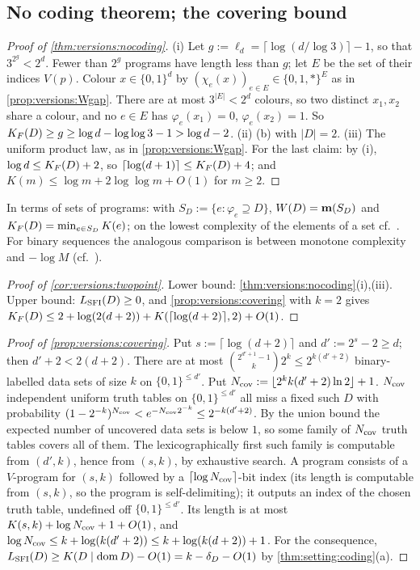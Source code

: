 \subsection{No coding theorem; the covering bound}\label{app:versions:nocoding}

\begin{proof}[Proof of \cref{thm:versions:nocoding}]
(i) Let $g:=\ell_d=\lceil\log(d/\log3)\rceil-1$, so that $3^{2^g}<2^d$. Fewer than $2^g$ programs have length less than $g$; let $E$ be the set of their indices $V(p)$. Colour $x\in\{0,1\}^d$ by $(\chi_e(x))_{e\in E}\in\{0,1,*\}^E$ as in \cref{prop:versions:Wgap}. There are at most $3^{|E|}<2^d$ colours, so two distinct $x_1,x_2$ share a colour, and no $e\in E$ has $\varphi_e(x_1)=0$, $\varphi_e(x_2)=1$. So $K_{F}(D)\ge g\ge\log d-\log\log3-1>\log d-2$.
(ii) (b) with $|D|=2$.
(iii) The uniform product law, as in \cref{prop:versions:Wgap}.
For the last claim: by (i), $\log d\le K_{F}(D)+2$, so $\lceil\log(d+1)\rceil\le K_{F}(D)+4$; and $K(m)\le\log m+2\log\log m+O(1)$ for $m\ge2$.
\end{proof}

In terms of sets of programs: with $S_D:=\{e:\varphi_e\supseteq D\}$, $W(D)=\mathbf{m}(S_D)$ and $K_{F}(D)=\min_{e\in S_D}K(e)$; on the lowest complexity of the elements of a set cf.\ \citet{levin2016occam,epstein2011sets}. For binary sequences the analogous comparison is between monotone complexity and $-\log M$ (cf.\ \citealp{gacs1983relation,day2011increasing}).

\begin{proof}[Proof of \cref{cor:versions:twopoint}]
Lower bound: \cref{thm:versions:nocoding}(i),(iii). Upper bound: $L_{\mathrm{SFI}}(D)\ge0$, and \cref{prop:versions:covering} with $k=2$ gives $K_{F}(D)\le2+\log(2(d+2))+K(\lceil\log(d+2)\rceil,2)+O(1)$.
\end{proof}

\begin{proof}[Proof of \cref{prop:versions:covering}]
Put $s:=\lceil\log(d+2)\rceil$ and $d':=2^s-2\ge d$; then $d'+2<2(d+2)$. There are at most $\binom{2^{d'+1}-1}{k}2^k\le2^{k(d'+2)}$ binary-labelled data sets of size $k$ on $\{0,1\}^{\le d'}$. Put $N_{\rm cov}:=\lfloor2^kk(d'+2)\ln2\rfloor+1$. $N_{\rm cov}$ independent uniform truth tables on $\{0,1\}^{\le d'}$ all miss a fixed such $D$ with probability $(1-2^{-k})^{N_{\rm cov}}<e^{-N_{\rm cov}2^{-k}}\le2^{-k(d'+2)}$. By the union bound the expected number of uncovered data sets is below $1$, so some family of $N_{\rm cov}$ truth tables covers all of them. The lexicographically first such family is computable from $(d',k)$, hence from $(s,k)$, by exhaustive search. A program consists of a $V$-program for $(s,k)$ followed by a $\lceil\log N_{\rm cov}\rceil$-bit index (its length is computable from $(s,k)$, so the program is self-delimiting); it outputs an index of the chosen truth table, undefined off $\{0,1\}^{\le d'}$. Its length is at most $K(s,k)+\log N_{\rm cov}+1+O(1)$, and $\log N_{\rm cov}\le k+\log(k(d'+2))\le k+\log(k(d+2))+1$. For the consequence, $L_{\mathrm{SFI}}(D)\ge K(D\mid\operatorname{dom} D)-O(1)=k-\delta_D-O(1)$ by \cref{thm:setting:coding}(a).
\end{proof}

